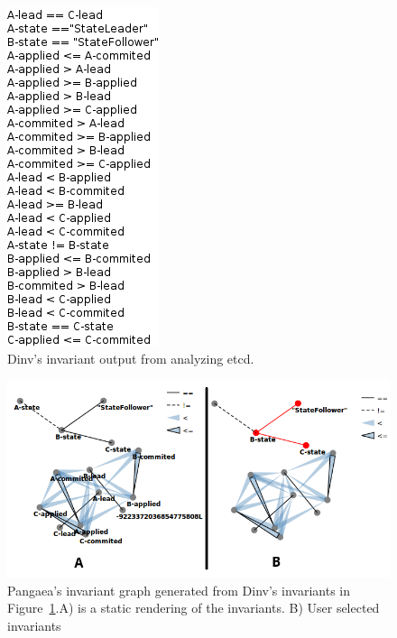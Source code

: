 \begin{figure}[h]
    \includegraphics[width=0.5\linewidth]{fig/dinv-output}%
    \caption{Dinv's invariant output from analyzing etcd.\label{fig:dinv-output}}%
\end{figure}

\begin{figure}[h]
    \includegraphics[width=\linewidth]{fig/invariant-graph}%
    \caption{Pangaea's invariant graph generated from Dinv's invariants in Figure~\ref{fig:dinv-output}.A) is a static rendering of the invariants. B) User selected invariants \label{fig:invariant-graph}}%
\end{figure}

